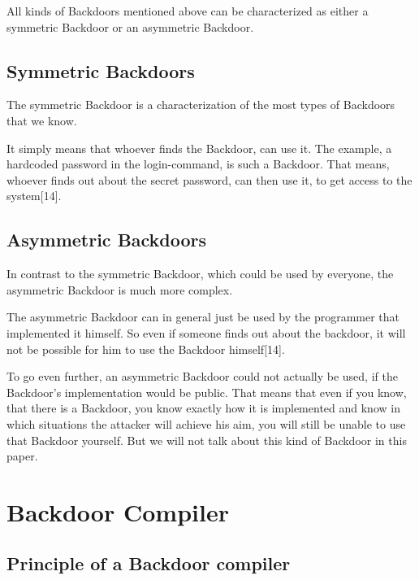 \documentclass[a4paper, 12pt]{article}
\begin{document}
All kinds of Backdoors mentioned above can be characterized as either a symmetric Backdoor or an asymmetric Backdoor.

\newpage

\subsection{Symmetric Backdoors}

The symmetric Backdoor is a characterization of the most types of Backdoors that we know.

It simply means that whoever finds the Backdoor, can use it. The example, a hardcoded password in the login-command, is such a Backdoor. That means, whoever finds out about the secret password, can then use it, to get access to the system[14].

\subsection{Asymmetric Backdoors}

In contrast to the symmetric Backdoor, which could be used by everyone, the asymmetric Backdoor is much more complex.

The asymmetric Backdoor can in general just be used by the programmer that implemented it himself. So even if someone finds out about the backdoor, it will not be possible for him to use the Backdoor himself[14].

To go even further, an asymmetric Backdoor could not actually be used, if the Backdoor's implementation would be public. That means that even if you know, that there is a Backdoor, you know exactly how it is implemented and know in which situations the attacker will achieve his aim, you will still be unable to use that Backdoor yourself. But we will not talk about this kind of Backdoor in this paper.

\newpage


\section{Backdoor Compiler}

\subsection{Principle of a Backdoor compiler}
\end{document}
